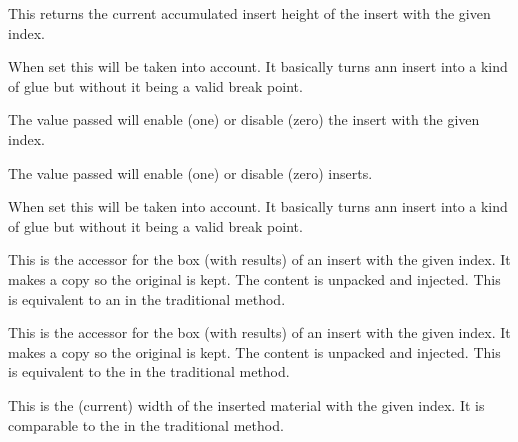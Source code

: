 \startnewprimitive[title={\prm {insertprogress}}]

This returns the current accumulated insert height of the insert with the given
index.

\stopnewprimitive

\startnewprimitive[title={\prm {insertshrink}}]

When set this will be taken into account. It basically turns ann insert into a
kind of glue but without it being a valid break point.

\stopnewprimitive

\startnewprimitive[title={\prm {insertstorage}}]

The value passed will enable (one) or disable (zero) the insert with the given
index.

\stopnewprimitive

\startnewprimitive[title={\prm {insertstoring}}]

The value passed will enable (one) or disable (zero) inserts.

\stopnewprimitive

\startnewprimitive[title={\prm {insertstretch}}]

When set this will be taken into account. It basically turns ann insert into a
kind of glue but without it being a valid break point.

\stopnewprimitive

\startnewprimitive[title={\prm {insertunbox}}]

This is the accessor for the box (with results) of an insert with the given
index. It makes a copy so the original is kept. The content is unpacked and
injected. This is equivalent to an  in the traditional method.

\stopnewprimitive

\startnewprimitive[title={\prm {insertuncopy}}]

This is the accessor for the box (with results) of an insert with the given
index. It makes a copy so the original is kept. The content is unpacked and
injected. This is equivalent to the  in the traditional method.

\stopnewprimitive

\startnewprimitive[title={\prm {insertwidth}}]

This is the (current) width of the inserted material with the given index. It is
comparable to the  in the traditional method.

\stopnewprimitive

